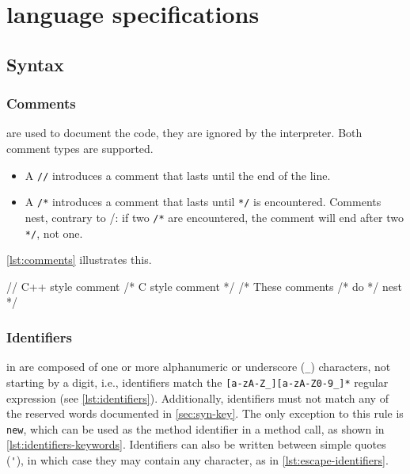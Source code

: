 \chapter{\us language specifications}
\label{sec:lang}

\section{Syntax}
\subsection{Comments}

 are used to document the code, they are ignored by the
\us interpreter. Both \Cxx comment types are supported.

\begin{itemize}
\item A \lstinline|//| introduces a comment that lasts until the end
  of the line.
\item A \lstinline|/*| introduces a comment that lasts until
  \lstinline|*/| is encountered. Comments nest, contrary to \C/\Cxx:
  if two \lstinline|/*| are encountered, the
  comment will end after two \lstinline|*/|, not one.
\end{itemize}

\autoref{lst:comments} illustrates this.

\begin{urbiscript}[caption=Comments,label=lst:comments,float=\floatpos]
// C++ style comment
/* C style comment */
/* These comments /* do */ nest */
\end{urbiscript}

\subsection{Identifiers}
\label{sec:us-syn-id}

 in \us are composed of one or more alphanumeric or
underscore (\lstinline|_|) characters, not starting
by a digit, i.e., identifiers match the
\lstinline|[a-zA-Z_][a-zA-Z0-9_]*| regular expression (see
\autoref{lst:identifiers}).  Additionally, identifiers must not match any of
the \us reserved words documented in \autoref{sec:syn-key}. The only
exception to this rule is \lstinline|new|, which can be used as the
method identifier in a method call, as shown in
\autoref{lst:identifiers-keywords}.  Identifiers can also be written
between simple quotes (\lstinline|'|), in which case they may contain
any character, as in \autoref{lst:escape-identifiers}.

